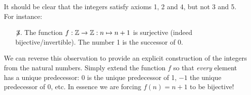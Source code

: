 % 
% 
% 
% 


It should be clear that the integers satisfy axioms 1, 2 and 4, but not 3 and 5. For instance:
\begin{itemize}
  \item[$\not\!3$.] The function $f:\mathbb{Z}\to\mathbb{Z}:n\mapsto n+1$ is surjective (indeed bijective/invertible). The number 1 is the successor of 0.  
\end{itemize}

We can reverse this observation to provide an explicit construction of the integers from the natural numbers. Simply extend the function $f$ so that \emph{every} element has a unique predecessor: 0 is the unique predecessor of 1, $-1$ the unique predecessor of 0, etc. In essence we are forcing $f(n)=n+1$ to be bijective!
\goodbreak

